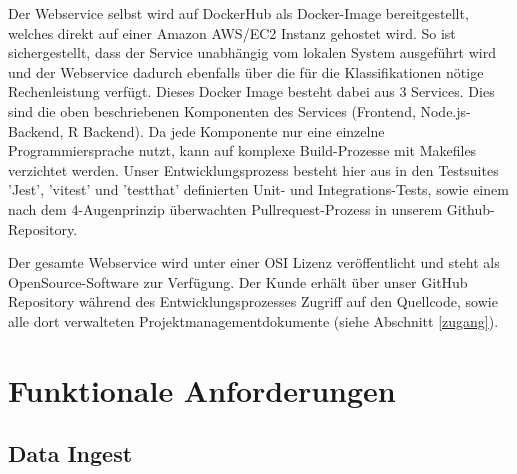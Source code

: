 \documentclass[a4paper,12pt]{article}
\begin{document}
\par
Der Webservice selbst wird auf DockerHub als Docker-Image bereitgestellt, welches direkt auf einer Amazon AWS/EC2 Instanz gehostet wird. So ist sichergestellt, dass der Service unabhängig vom lokalen System ausgeführt wird und der Webservice dadurch ebenfalls über die für die Klassifikationen nötige Rechenleistung verfügt.
Dieses Docker Image besteht dabei aus 3 Services. Dies sind die oben beschriebenen Komponenten des Services (Frontend, Node.js-Backend, R Backend). Da jede Komponente nur eine einzelne Programmiersprache nutzt, kann auf komplexe Build-Prozesse mit Makefiles verzichtet werden. Unser Entwicklungsprozess besteht hier aus in den Testsuites 'Jest', 'vitest' und 'testthat' definierten Unit- und Integrations-Tests, sowie einem nach dem 4-Augenprinzip überwachten Pullrequest-Prozess in unserem Github-Repository.
\par
Der gesamte Webservice wird unter einer OSI Lizenz veröffentlicht und steht als OpenSource-Software zur Verfügung. Der Kunde erhält über unser GitHub Repository während des Entwicklungsprozesses Zugriff auf den Quellcode, sowie alle dort verwalteten Projektmanagementdokumente (siehe Abschnitt \ref{zugang}).


\section{Funktionale Anforderungen}

\subsection{Data Ingest}
\end{document}
